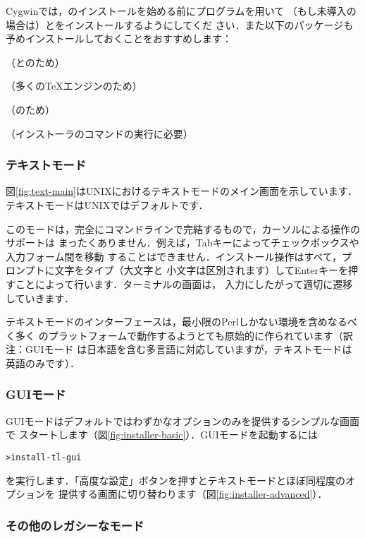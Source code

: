 \documentclass[uplatex,dvipdfmx,tombow]{jsarticle}
\begin{document}
Cygwinでは，\TL のインストールを始める前にプログラムを用いて
（もし未導入の場合は）とをインストールするようにしてくだ
さい．また以下のパッケージも予めインストールしておくことをおすすめします：
%
\begin{itemize*}
\item {}（\XeTeX と\LuaTeX のため）
\item {}（多くの\TeX エンジンのため）
\item {}（のため）
\item {}（インストーラのコマンドの実行に必要）
\end{itemize*}

\subsubsection{テキストモード}

図\ref{fig:text-main}はUNIXにおけるテキストモードのメイン画面を示しています．
テキストモードはUNIXではデフォルトです．

このモードは，完全にコマンドラインで完結するもので，カーソルによる操作のサポートは
まったくありません．例えば，Tabキーによってチェックボックスや入力フォーム間を移動
することはできません．インストール操作はすべて，プロンプトに文字をタイプ（大文字と
小文字は区別されます）してEnterキーを押すことによって行います．ターミナルの画面は，
入力にしたがって適切に遷移していきます．

テキストモードのインターフェースは，最小限のPerlしかない環境を含めなるべく多く
のプラットフォームで動作するようとても原始的に作られています（訳注：GUIモード
は日本語を含む多言語に対応していますが，テキストモードは英語のみです）．

\subsubsection{GUIモード}
\label{sec:graphical-inst}

GUIモードはデフォルトではわずかなオプションのみを提供するシンプルな画面で
スタートします（図\ref{fig:installer-basic}）．GUIモードを起動するには
%
\begin{alltt}
> install-tl -gui
\end{alltt}
%
を実行します．「高度な設定」ボタンを押すとテキストモードとほぼ同程度のオプションを
提供する画面に切り替わります（図\ref{fig:installer-advanced}）．

\subsubsection{その他のレガシーなモード}
\end{document}
